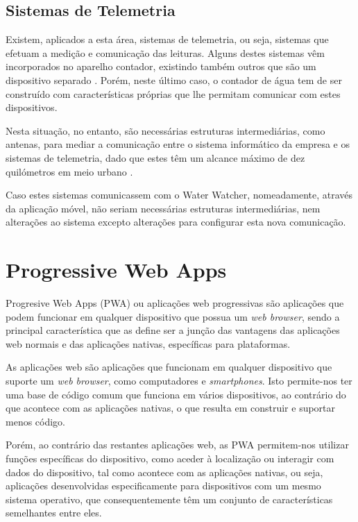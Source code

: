 \subsection{Sistemas de Telemetria} \label{par:telemetria}
Existem, aplicados a esta área, sistemas de telemetria, ou seja, sistemas que efetuam a medição e comunicação das leituras. Alguns destes sistemas vêm incorporados no aparelho contador, existindo também outros que são um dispositivo separado \cite{janz:impji}. Porém, neste último caso, o contador de água tem de ser construído com características próprias que lhe permitam comunicar com estes dispositivos.\par
Nesta situação, no entanto, são necessárias estruturas intermediárias, como antenas, para mediar a comunicação entre o sistema informático da empresa e os sistemas de telemetria, dado que estes têm um alcance máximo de dez quilómetros em meio urbano \cite{mywater}. \par
Caso estes sistemas comunicassem com o Water Watcher, nomeadamente, através da aplicação móvel, não seriam necessárias estruturas intermediárias, nem alterações ao sistema excepto alterações para configurar esta nova comunicação.

\section{Progressive Web Apps} \label{sec:pwa}
Progresive Web Apps (PWA) ou aplicações web progressivas são aplicações que podem funcionar em qualquer dispositivo que possua um \textit{web browser}, sendo a principal característica que as define ser a junção das vantagens das aplicações web normais e das aplicações nativas, específicas para plataformas.\par
As aplicações web são aplicações que funcionam em qualquer dispositivo que suporte um \textit{web browser}, como computadores e \textit{smartphones}. Isto permite-nos ter uma base de código comum que funciona em vários dispositivos, ao contrário do que acontece com as aplicações nativas, o que resulta em construir e suportar menos código.\par
Porém, ao contrário das restantes aplicações web, as PWA permitem-nos utilizar funções específicas do dispositivo, como aceder à localização ou interagir com dados do dispositivo, tal como acontece com as aplicações nativas, ou seja, aplicações desenvolvidas especificamente para dispositivos com um mesmo sistema operativo, que consequentemente têm um conjunto de características semelhantes entre eles.

